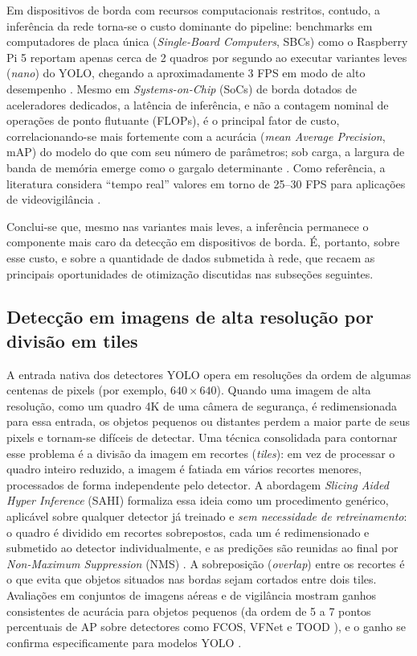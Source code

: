 \documentclass{ieeeaccess}
\begin{document}
Em dispositivos de borda com recursos computacionais restritos, contudo,
a inferência da rede torna-se o custo dominante do pipeline: benchmarks em
computadores de placa única (\textit{Single-Board Computers}, SBCs) como o Raspberry Pi 5 reportam apenas cerca
de 2 quadros por segundo ao executar variantes leves (\textit{nano}) do YOLO, chegando a
aproximadamente 3 FPS em modo de alto desempenho \cite{shalash2026benchmark}.
Mesmo em \textit{Systems-on-Chip} (SoCs) de borda dotados de aceleradores dedicados, a latência de
inferência, e não a contagem nominal de operações de ponto flutuante (FLOPs), é o principal
fator de custo, correlacionando-se mais fortemente com a acurácia (\textit{mean Average Precision}, mAP) do
modelo do que com seu número de parâmetros; sob carga, a largura de banda de
memória emerge como o gargalo determinante \cite{kong2026edgesocs}. Como
referência, a literatura considera ``tempo real'' valores em torno de
25--30 FPS para aplicações de videovigilância \cite{kong2026edgesocs}.

Conclui-se que, mesmo nas variantes mais leves, a inferência permanece o
componente mais caro da detecção em dispositivos de borda. É, portanto, sobre esse
custo, e sobre a quantidade de dados submetida à rede, que recaem as
principais oportunidades de otimização discutidas nas subseções seguintes.

\subsection{Detecção em imagens de alta resolução por divisão em tiles}
\label{subsec:tiling}

A entrada nativa dos detectores YOLO opera em resoluções da ordem de algumas
centenas de pixels (por exemplo, $640\times640$). Quando uma imagem de alta
resolução, como um quadro 4K de uma câmera de segurança, é redimensionada
para essa entrada, os objetos pequenos ou distantes perdem a maior parte de seus
pixels e tornam-se difíceis de detectar. Uma técnica consolidada para contornar
esse problema é a divisão da imagem em recortes (\textit{tiles}): em vez de
processar o quadro inteiro reduzido, a imagem é fatiada em vários recortes
menores, processados de forma independente pelo detector. A abordagem
\textit{Slicing Aided Hyper Inference} (SAHI) formaliza essa ideia como um
procedimento genérico, aplicável sobre qualquer detector já treinado e
\textit{sem necessidade de retreinamento}: o quadro é dividido em recortes
sobrepostos, cada um é redimensionado e submetido ao detector individualmente, e
as predições são reunidas ao final por \textit{Non-Maximum Suppression} (NMS)
\cite{akyon2022sahi}. A sobreposição (\textit{overlap}) entre os recortes é o
que evita que objetos situados nas bordas sejam cortados entre dois tiles.
Avaliações em conjuntos de imagens aéreas e de vigilância mostram ganhos
consistentes de acurácia para objetos pequenos (da ordem de 5 a 7 pontos
percentuais de AP sobre detectores como FCOS, VFNet e TOOD \cite{akyon2022sahi}), e o ganho se confirma especificamente para modelos YOLO
\cite{keles2022sliced}.
\end{document}
